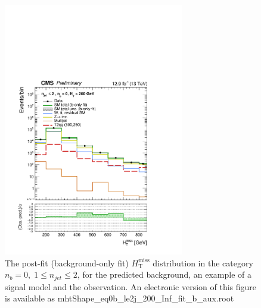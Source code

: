 \clearpage
\begin{figure}[tbhp]
    \caption{ 
    The post-fit (background-only fit) $H_{\mathrm{T}}^{\mathrm{miss}}$ distribution in the category $n_{b}=0, \; 1 \leq n_{jet} \leq 2$, 
    for the predicted background, an example of a signal model and the observation.
    An electronic version of this figure is available as mhtShape\_eq0b\_le2j\_200\_Inf\_fit\_b\_aux.root
    \label{fig:mhtShape_eq0b_le2j_fit_b} }
  \begin{center}
  \includegraphics[width=0.7\textwidth]{mhtShape_eq0b_le2j_200_Inf_fit_b_aux}
  \end{center}
\end{figure}


